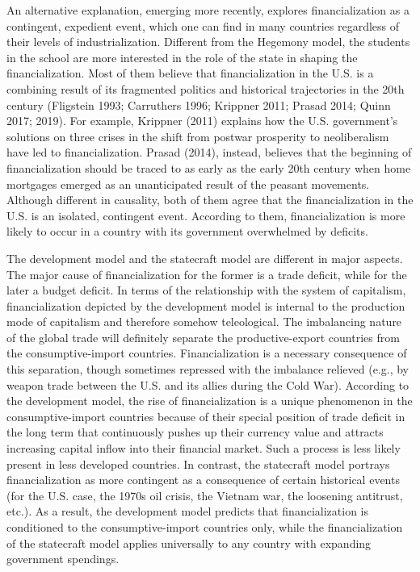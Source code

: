 \documentclass[
]{article}
\begin{document}
An alternative explanation, emerging more recently, explores
financialization as a contingent, expedient event, which one can find in
many countries regardless of their levels of industrialization.
Different from the Hegemony model, the students in the school are more
interested in the role of the state in shaping the financialization.
Most of them believe that financialization in the U.S. is a combining
result of its fragmented politics and historical trajectories in the
20th century (Fligstein 1993; Carruthers 1996; Krippner 2011; Prasad
2014; Quinn 2017; 2019). For example, Krippner (2011) explains how the
U.S. government's solutions on three crises in the shift from postwar
prosperity to neoliberalism have led to financialization. Prasad (2014),
instead, believes that the beginning of financialization should be
traced to as early as the early 20th century when home mortgages emerged
as an unanticipated result of the peasant movements. Although different
in causality, both of them agree that the financialization in the U.S.
is an isolated, contingent event. According to them, financialization is
more likely to occur in a country with its government overwhelmed by
deficits.

The development model and the statecraft model are different in major
aspects. The major cause of financialization for the former is a trade
deficit, while for the later a budget deficit. In terms of the
relationship with the system of capitalism, financialization depicted by
the development model is internal to the production mode of capitalism
and therefore somehow teleological. The imbalancing nature of the global
trade will definitely separate the productive-export countries from the
consumptive-import countries. Financialization is a necessary
consequence of this separation, though sometimes repressed with the
imbalance relieved (e.g., by weapon trade between the U.S. and its
allies during the Cold War). According to the development model, the
rise of financialization is a unique phenomenon in the
consumptive-import countries because of their special position of trade
deficit in the long term that continuously pushes up their currency
value and attracts increasing capital inflow into their financial
market. Such a process is less likely present in less developed
countries. In contrast, the statecraft model portrays financialization
as more contingent as a consequence of certain historical events (for
the U.S. case, the 1970s oil crisis, the Vietnam war, the loosening
antitrust, etc.). As a result, the development model predicts that
financialization is conditioned to the consumptive-import countries
only, while the financialization of the statecraft model applies
universally to any country with expanding government spendings.
\end{document}
